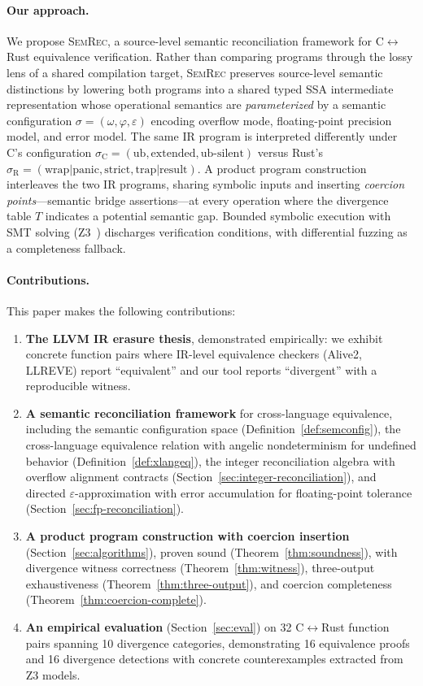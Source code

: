 \documentclass[11pt]{article}
\newcommand{\SemConfig}{\sigma}
\newcommand{\SemConfigC}{\sigma_{\mathrm{C}}}
\newcommand{\SemConfigR}{\sigma_{\mathrm{R}}}
\begin{document}
\paragraph{Our approach.}
We propose \textsc{SemRec}, a source-level semantic reconciliation framework for C$\leftrightarrow$Rust equivalence verification.
Rather than comparing programs through the lossy lens of a shared compilation target, \textsc{SemRec} preserves source-level semantic distinctions by lowering both programs into a shared typed SSA intermediate representation whose operational semantics are \emph{parameterized} by a semantic configuration $\SemConfig = (\omega, \varphi, \varepsilon)$ encoding overflow mode, floating-point precision model, and error model.
The same IR program is interpreted differently under C's configuration $\SemConfigC = (\mathrm{ub}, \mathrm{extended}, \mathrm{ub\text{-}silent})$ versus Rust's $\SemConfigR = (\mathrm{wrap}|\mathrm{panic}, \mathrm{strict}, \mathrm{trap}|\mathrm{result})$.
A product program construction interleaves the two IR programs, sharing symbolic inputs and inserting \emph{coercion points}---semantic bridge assertions---at every operation where the divergence table $T$ indicates a potential semantic gap.
Bounded symbolic execution with SMT solving (Z3~\cite{demoura2008z3}) discharges verification conditions, with differential fuzzing as a completeness fallback.

\paragraph{Contributions.}
This paper makes the following contributions:
\begin{enumerate}[leftmargin=*]
  \item \textbf{The LLVM IR erasure thesis}, demonstrated empirically: we exhibit concrete function pairs where IR-level equivalence checkers (Alive2, LLREVE) report ``equivalent'' and our tool reports ``divergent'' with a reproducible witness.
  \item \textbf{A semantic reconciliation framework} for cross-language equivalence, including the semantic configuration space (Definition~\ref{def:semconfig}), the cross-language equivalence relation with angelic nondeterminism for undefined behavior (Definition~\ref{def:xlangeq}), the integer reconciliation algebra with overflow alignment contracts (Section~\ref{sec:integer-reconciliation}), and directed $\varepsilon$-approximation with error accumulation for floating-point tolerance (Section~\ref{sec:fp-reconciliation}).
  \item \textbf{A product program construction with coercion insertion} (Section~\ref{sec:algorithms}), proven sound (Theorem~\ref{thm:soundness}), with divergence witness correctness (Theorem~\ref{thm:witness}), three-output exhaustiveness (Theorem~\ref{thm:three-output}), and coercion completeness (Theorem~\ref{thm:coercion-complete}).
  \item \textbf{An empirical evaluation} (Section~\ref{sec:eval}) on 32 C$\leftrightarrow$Rust function pairs spanning 10 divergence categories, demonstrating 16 equivalence proofs and 16 divergence detections with concrete counterexamples extracted from Z3 models.
\end{enumerate}
\end{document}
